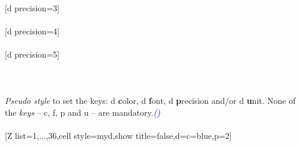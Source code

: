 \\ [10pt][d precision=3]%
\\ [10pt]\makebox[\linewidth][c]{\scalebox{.6}{\pgfPT[d precision=3]}}%
\\ [10pt][d precision=4]%
\\ [10pt]\makebox[\linewidth][c]{\scalebox{.6}{\pgfPT[d precision=4]}}%
\\ [10pt][d precision=5]%
\\ [10pt]\makebox[\linewidth][c]{\scalebox{.6}{\pgfPT[d precision=5]}}%
\\ [0pt]\pgfPTendoption%
\newpage\ \\ [-32pt]%
%
{\ \\ [-3pt]\textit{Pseudo style} to set the keys: d \textbf{c}olor, d \textbf{f}ont, d \textbf{p}recision and/or d \textbf{u}nit.
None of the \textit{keys} -- c, f, p and u -- are mandatory.\hfill\textit{\textcolor{blue}{()}}
\\ [10pt]%
}%
\\ [5pt][Z list={1,...,36},cell style=myd,show title=false,d={c=blue,p=2}]%
\\ [10pt]\makebox[\linewidth][c]{\scalebox{.6}{\pgfPT[Z list={1,...,36},cell style=myd,show title=false,d={c=blue,p=2}]}}%
\\ [0pt]\pgfPTendstyle%
\endinput
